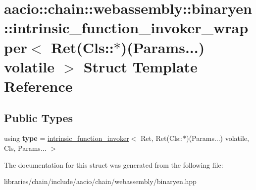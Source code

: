 \hypertarget{structaacio_1_1chain_1_1webassembly_1_1binaryen_1_1intrinsic__function__invoker__wrapper_3_01_rece20ae8f79a4976c63400071db92aaf0}{}\section{aacio\+:\+:chain\+:\+:webassembly\+:\+:binaryen\+:\+:intrinsic\+\_\+function\+\_\+invoker\+\_\+wrapper$<$ Ret(Cls\+:\+:$\ast$)(Params...) volatile $>$ Struct Template Reference}
\label{structaacio_1_1chain_1_1webassembly_1_1binaryen_1_1intrinsic__function__invoker__wrapper_3_01_rece20ae8f79a4976c63400071db92aaf0}
\subsection*{Public Types}
\begin{DoxyCompactItemize}
\item 
\mbox{\label{structaacio_1_1chain_1_1webassembly_1_1binaryen_1_1intrinsic__function__invoker__wrapper_3_01_rece20ae8f79a4976c63400071db92aaf0_a34c2183832851eb978f6f3590a4518c8}} 
using {\bfseries type} = \mbox{\hyperlink{structaacio_1_1chain_1_1webassembly_1_1binaryen_1_1intrinsic__function__invoker}{intrinsic\+\_\+function\+\_\+invoker}}$<$ Ret, Ret(Cls\+::$\ast$)(Params...) volatile, Cls, Params... $>$
\end{DoxyCompactItemize}


The documentation for this struct was generated from the following file\+:\begin{DoxyCompactItemize}
\item 
libraries/chain/include/aacio/chain/webassembly/binaryen.\+hpp\end{DoxyCompactItemize}
